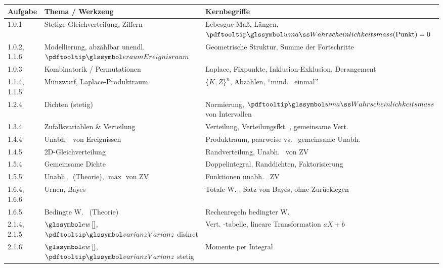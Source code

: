 \begin{mytable}
    \begin{tabular}{p{2.3cm} p{6.2cm} p{6.4cm}}
        \hline
        \textbf{Aufgabe} & \textbf{Thema / Werkzeug}                 & \textbf{Kernbegriffe}                                \\
        \hline
        1.0.1            & Stetige Gleichverteilung, Ziffern         & Lebesgue-Maß, Längen, $\pe(\text{Punkt})=0$          \\
        1.0.2, 1.1.6     & Modellierung, abzählbar unendl. \ $\eraum$ & Geometrische Struktur, Summe der Fortschritte        \\
        1.0.3            & Kombinatorik / Permutationen              & Laplace, Fixpunkte, Inklusion-Exklusion, Derangement \\
        1.1.4, 1.1.5     & Münzwurf, Laplace-Produktraum             & $\{K,Z\}^n$, Abzählen, ``mind. \ einmal''             \\
        1.2.4            & Dichten (stetig)                          & Normierung, $\pe$ von Intervallen                    \\
        1.3.4            & Zufallsvariablen \& Verteilung            & Verteilung, Verteilungsfkt. , gemeinsame Vert. \\
        1.4.4            & Unabh. \ von Ereignissen                   & Produktraum, paarweise vs. \ gemeinsame Unabh. \\
        1.4.5            & 2D-Gleichverteilung                       & Randverteilung, Unabh. \ von ZV                       \\
        1.5.4            & Gemeinsame Dichte                         & Doppelintegral, Randdichten, Faktorisierung          \\
        1.5.5            & Unabh. \ (Theorie), $\max$ von ZV          & Funktionen unabh. \ ZV                                \\
        1.6.4, 1.6.6     & Urnen, Bayes                              & Totale W. , Satz von Bayes, ohne Zurücklegen          \\
        1.6.5            & Bedingte W. \ (Theorie)                    & Rechenregeln bedingter W. \\
        2.1.4, 2.1.5     & $\E{}$, $\Var$ diskret                    & Vert. -tabelle, lineare Transformation $aX+b$         \\
        2.1.6            & $\E{}$, $\Var$ stetig                     & Momente per Integral                                 \\

\end{tabular}
\end{mytable}
